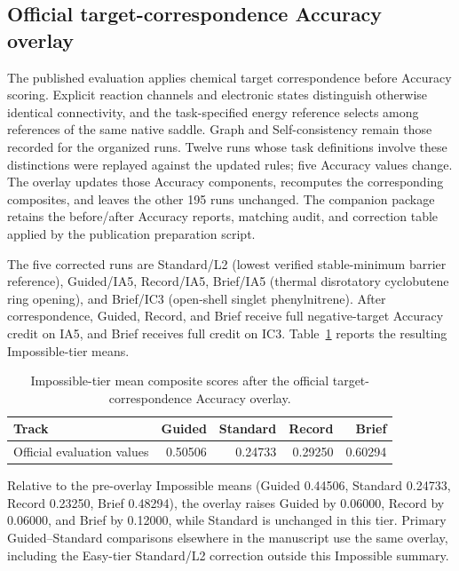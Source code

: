 \subsection{Official target-correspondence Accuracy overlay}
\label{sec:matcher-sensitivity}

The published evaluation applies chemical target correspondence before Accuracy scoring. Explicit reaction channels and electronic states distinguish otherwise identical connectivity, and the task-specified energy reference selects among references of the same native saddle. Graph and Self-consistency remain those recorded for the organized runs. Twelve runs whose task definitions involve these distinctions were replayed against the updated rules; five Accuracy values change. The overlay updates those Accuracy components, recomputes the corresponding composites, and leaves the other 195 runs unchanged. The companion package  retains the before/after Accuracy reports, matching audit, and correction table applied by the publication preparation script.

The five corrected runs are Standard/L2 (lowest verified stable-minimum barrier reference), Guided/IA5, Record/IA5, Brief/IA5 (thermal disrotatory cyclobutene ring opening), and Brief/IC3 (open-shell singlet phenylnitrene). After correspondence, Guided, Record, and Brief receive full negative-target Accuracy credit on IA5, and Brief receives full credit on IC3. Table~\ref{tab:matcher-sensitivity} reports the resulting Impossible-tier means.

\begin{table}[htbp]
\centering
\small
\caption{Impossible-tier mean composite scores after the official target-correspondence Accuracy overlay.}
\label{tab:matcher-sensitivity}
\begin{tabular}{@{}lrrrr@{}}
\toprule
Track & Guided & Standard & Record & Brief \\
\midrule
Official evaluation values & 0.50506 & 0.24733 & 0.29250 & 0.60294 \\
\bottomrule
\end{tabular}
\end{table}

Relative to the pre-overlay Impossible means (Guided 0.44506, Standard 0.24733, Record 0.23250, Brief 0.48294), the overlay raises Guided by 0.06000, Record by 0.06000, and Brief by 0.12000, while Standard is unchanged in this tier. Primary Guided--Standard comparisons elsewhere in the manuscript use the same overlay, including the Easy-tier Standard/L2 correction outside this Impossible summary.
